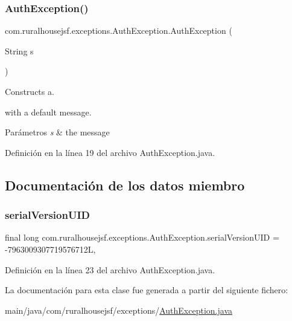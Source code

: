 \subsubsection{\texorpdfstring{AuthException()}{AuthException()}\hspace{0.1cm}{\footnotesize\ttfamily [2/2]}}
{\footnotesize\ttfamily com.\+ruralhousejsf.\+exceptions.\+Auth\+Exception.\+Auth\+Exception (\begin{DoxyParamCaption}\item[{String}]{s }\end{DoxyParamCaption})}



Constructs a. 


\begin{DoxyCode}{0}
\end{DoxyCode}
 with a default message. 
\begin{DoxyParams}{Parámetros}
{\em s} & the message \\
\hline
\end{DoxyParams}


Definición en la línea 19 del archivo Auth\+Exception.\+java.



\subsection{Documentación de los datos miembro}
\mbox{\label{classcom_1_1ruralhousejsf_1_1exceptions_1_1_auth_exception_a0bda3b553296d4340933a563b323bb5f}} 
\subsubsection{\texorpdfstring{serialVersionUID}{serialVersionUID}}
{\footnotesize\ttfamily final long com.\+ruralhousejsf.\+exceptions.\+Auth\+Exception.\+serial\+Version\+U\+ID = -\/7963009307719576712L\hspace{0.3cm}{\ttfamily [static]}, {\ttfamily [private]}}



Definición en la línea 23 del archivo Auth\+Exception.\+java.



La documentación para esta clase fue generada a partir del siguiente fichero\+:\begin{DoxyCompactItemize}
\item 
main/java/com/ruralhousejsf/exceptions/\mbox{\hyperlink{_auth_exception_8java}{Auth\+Exception.\+java}}\end{DoxyCompactItemize}
